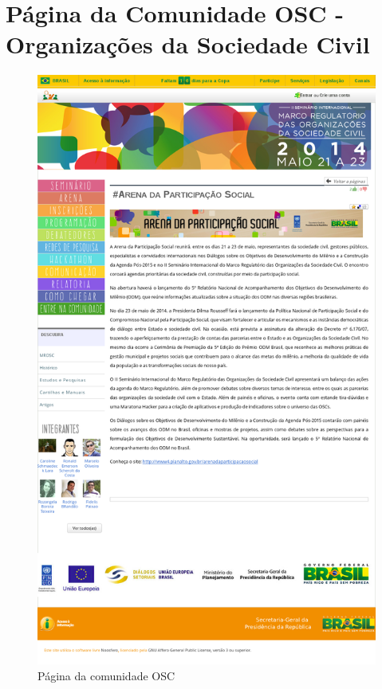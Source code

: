 \section{Página da Comunidade OSC - Organizações da Sociedade Civil}
\label{Att:PaginaComunidade}

\begin{figure}[h]
\center
\includegraphics[scale=0.2]{tela-comunidade.png}
\caption{Página da comunidade OSC}
\label{fig:tela-comunidade}
\end{figure}

